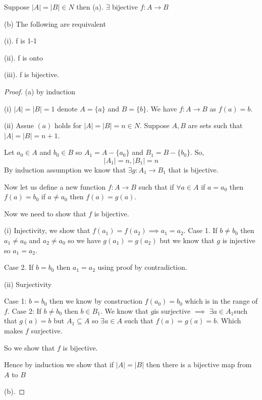 \begin{theorem}
    Suppose $|A| = |B| \in N$ then
    (a). $\exists$ bijective $f: A \rightarrow B$ 

    (b) The following are requivalent


    (i). f is 1-1

    (ii). f is onto

    (iii). f is bijective.
\end{theorem}
\begin{proof} (a) by induction

    (i) $|A| = |B| = 1$ denote $A = \{a\}$ and $B = \{b\}$. We have  $f: A \rightarrow B$ as $f(a)= b$. 

    (ii) Assue $(a)$ holds for $|A| = |B| = n \in N$. Suppose $A,B$ are sets such that $|A| = |B| = n + 1$.

    Let  $a_0 \in A$ and $b_0 \in B$ so $A_1 = A - \{a_0\}$ and $B_1 = B - \{b_0\}$. So, 
    $$ |A_1| = n, |B_1| = n $$ By induction assumption we know that $\exists g: A_1 \rightarrow B_1 $ that is bijective.

    Now let us define a new function $f : A \rightarrow B$ such that if $\forall a \in A$ if $a = a_0 $ then $f(a) = b_0$ if $a \ne a_0$ then $f(a) = g(a)$.

    Now we need to show that  $f$ is bijective.

    (i) Injectivity, we show that $f(a_1) = f(a_2) \implies a_1 = a_2$.
    Case 1. If $b \ne b_0$ then $a_1 \ne a_0$ and $a_2 \ne a_0$ so  we have  $g(a_1) = g(a_2)$ but we know that $g$ is injective so $a_1 = a_2$. 

    Case 2. If $b = b_0$ then $a_1 = a_2$ using proof by contradiction.



    (ii) Surjectivity

    Case 1: $b = b_0$ then we know by construction  $f(a_0) = b_0$ which is in the range of $f.$
    Case 2: If  $b \ne b_0$ then  $b \in B_1$. We know that $g$is surjective $\implies$ $\exists a \in A_1$such that $g(a) = b$ but $A_1 \subseteq A$ so $\exists a \in A$ such that $f(a) = g(a) = b$. Which makes $f$ surjective.

    So we show that $f$ is bijective.

    Hence by induction we show that if $|A| = |B|$ then there is a bijective map from $A$ to $B$

    \vspace{2em}

    (b). 


\end{proof}
